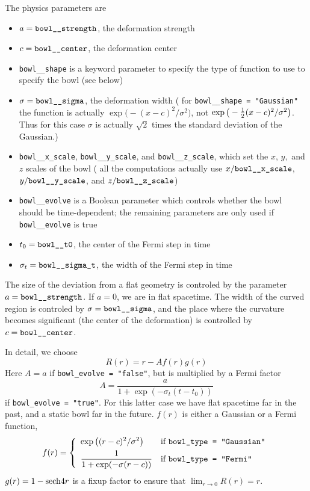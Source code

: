 The physics parameters are
\begin{itemize}
\item	$a = \verb|bowl__strength|$, the deformation strength
\item	$c = \verb|bowl__center|$, the deformation center
\item	\verb|bowl__shape| is a keyword parameter to specify
	the type of function to use to specify the bowl (see below)
\item	$\sigma = \verb|bowl__sigma|$, the deformation width
	(\Nb{} for \verb|bowl__shape = "Gaussian"| the function
	is actually $\exp \big( \!-(x-c)^2/\sigma^2 \big)$, not
	$\exp \big( -{\textstyle \frac{1}{2}}(x-c)^2/\sigma^2 \big)$.  Thus for
	this case $\sigma$ is actually $\sqrt{2}$ times the
	standard deviation of the Gaussian.)
\item	\verb|bowl__x_scale|, \verb|bowl__y_scale|, and \verb|bowl__z_scale|,
	which set the $x$, $y,$ and $z$ scales of the bowl
	(\ie{} all the computations actually use $x/\verb|bowl__x_scale|$,
	$y/\verb|bowl__y_scale|$, and $z/\verb|bowl__z_scale|$)
\item	\verb|bowl__evolve| is a Boolean parameter which controls
	whether the bowl should be time-dependent; the remaining
	parameters are only used if \verb|bowl__evolve| is true
\item	$t_0 = \verb|bowl__t0|$, the center of the Fermi step in time
\item	$\sigma_t = \verb|bowl__sigma_t|$, the width of the Fermi step in time
\end{itemize}

The size of the deviation from a flat geometry is controled by the
parameter $a = \verb|bowl__strength|$.  If $a = 0$, we are in flat spacetime.
The width of the curved region is controled by $\sigma = \verb|bowl__sigma|$,
and the place where the curvature becomes significant (the center of
the deformation) is controlled by $c = \verb|bowl__center|$.

In detail, we choose
\begin{equation}
R(r) = r - A f(r) g(r)
\end{equation}
Here $A = a$ if \verb|bowl_evolve = "false"|, but is multiplied by
a Fermi factor
\begin{equation}
A = \frac{a}{1 + \exp(-\sigma_t(t-t_0))}
\end{equation}
if \verb|bowl_evolve = "true"|.  For this latter case we have
flat spacetime far in the past, and a static bowl far in the future.
$f(r)$ is either a Gaussian or a Fermi function,
\begin{equation}
f(r) = \left\{
       \begin{array}{ll}
       \displaystyle
       \exp \big( (r-c)^2/\sigma^2 \big)
			& \hbox{if {\tt bowl\_type = "Gaussian"}}	\\[1ex]
       \displaystyle
       \frac{1}{1 + \exp(-\sigma(r-c))}
			& \hbox{if {\tt bowl\_type = "Fermi"}}		%
       \end{array}
       \right.
\end{equation}
$g(r) = 1 - {\rm sech} 4r$ is a fixup factor to ensure that
$\displaystyle \lim_{r \to 0} R(r) = r$.

